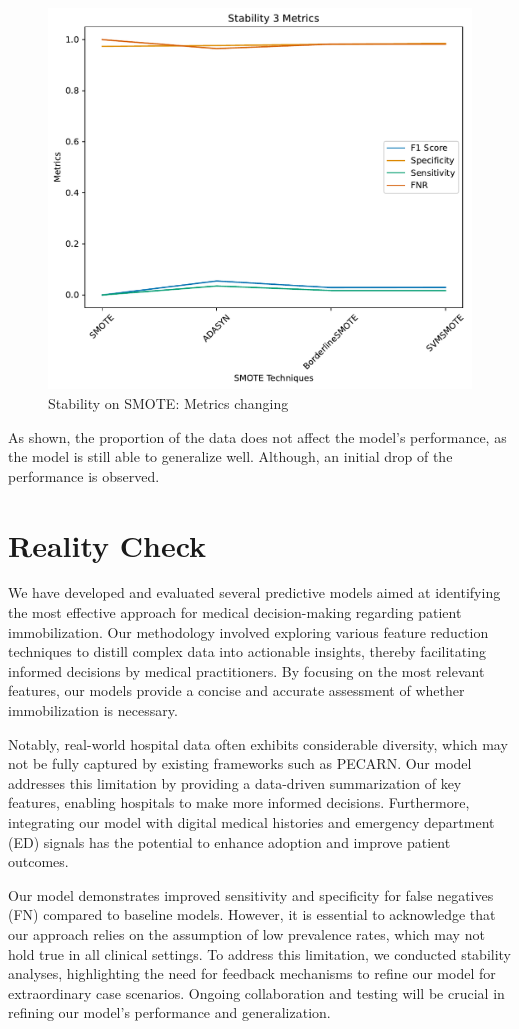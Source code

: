 \documentclass[10pt,letterpaper]{article}
\begin{document}
\begin{figure}[H]
    \centering
    \includegraphics[width=0.5\linewidth]{../plots/tabpfn_stability3_metrics.pdf}
    \caption{Stability on SMOTE: Metrics changing}
    \label{fig:enter-label}
\end{figure}

As shown, the proportion of the data does not affect the model's performance, as the model is still able to generalize well. Although,
an initial drop of the performance is observed. 


\section{Reality Check}

We have developed and evaluated several predictive models aimed at identifying the most effective approach for medical decision-making regarding patient immobilization. Our methodology involved exploring various feature reduction techniques to distill complex data into actionable insights, thereby facilitating informed decisions by medical practitioners. By focusing on the most relevant features, our models provide a concise and accurate assessment of whether immobilization is necessary.

Notably, real-world hospital data often exhibits considerable diversity, which may not be fully captured by existing frameworks such as PECARN. Our model addresses this limitation by providing a data-driven summarization of key features, enabling hospitals to make more informed decisions. Furthermore, integrating our model with digital medical histories and emergency department (ED) signals has the potential to enhance adoption and improve patient outcomes.

Our model demonstrates improved sensitivity and specificity for false negatives (FN) compared to baseline models. However, it is essential to acknowledge that our approach relies on the assumption of low prevalence rates, which may not hold true in all clinical settings. To address this limitation, we conducted stability analyses, highlighting the need for feedback mechanisms to refine our model for extraordinary case scenarios. Ongoing collaboration and testing will be crucial in refining our model's performance and generalization.
\end{document}
